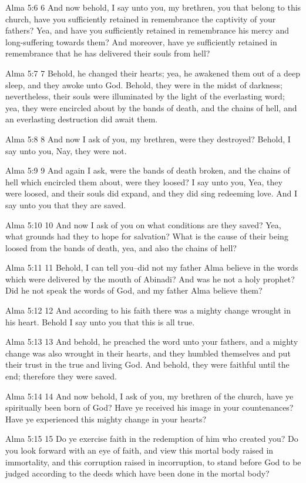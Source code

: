 Alma 5:6
 6 And now behold, I say unto you, my brethren, you that belong
to this church, have you sufficiently retained in remembrance the
captivity of your fathers? Yea, and have you sufficiently
retained in remembrance his mercy and long-suffering towards
them? And moreover, have ye sufficiently retained in remembrance
that he has delivered their souls from hell?

Alma 5:7
 7 Behold, he changed their hearts; yea, he awakened them out of
a deep sleep, and they awoke unto God. Behold, they were in the
midst of darkness; nevertheless, their souls were illuminated by
the light of the everlasting word; yea, they were encircled about
by the bands of death, and the chains of hell, and an everlasting
destruction did await them.

Alma 5:8
 8 And now I ask of you, my brethren, were they destroyed?
Behold, I say unto you, Nay, they were not.

Alma 5:9
 9 And again I ask, were the bands of death broken, and the
chains of hell which encircled them about, were they loosed? I
say unto you, Yea, they were loosed, and their souls did expand,
and they did sing redeeming love. And I say unto you that they
are saved.

Alma 5:10
 10 And now I ask of you on what conditions are they saved? Yea,
what grounds had they to hope for salvation? What is the cause
of their being loosed from the bands of death, yea, and also the
chains of hell?

Alma 5:11
 11 Behold, I can tell you--did not my father Alma believe in the
words which were delivered by the mouth of Abinadi? And was he
not a holy prophet? Did he not speak the words of God, and my
father Alma believe them?

Alma 5:12
 12 And according to his faith there was a mighty change wrought
in his heart. Behold I say unto you that this is all true.

Alma 5:13
 13 And behold, he preached the word unto your fathers, and a
mighty change was also wrought in their hearts, and they humbled
themselves and put their trust in the true and living God. And
behold, they were faithful until the end; therefore they were
saved.

Alma 5:14
 14 And now behold, I ask of you, my brethren of the church, have
ye spiritually been born of God? Have ye received his image in
your countenances? Have ye experienced this mighty change in
your hearts?

Alma 5:15
 15 Do ye exercise faith in the redemption of him who created
you? Do you look forward with an eye of faith, and view this
mortal body raised in immortality, and this corruption raised in
incorruption, to stand before God to be judged according to the
deeds which have been done in the mortal body?

